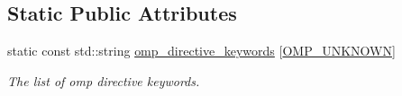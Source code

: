 \subsection*{Static Public Attributes}
\begin{DoxyCompactItemize}
\item 
static const std\+::string \hyperlink{classpragma__manager_ae98fee9f9beb214e7945b0b4eeb69522}{omp\+\_\+directive\+\_\+keywords} \mbox{[}\hyperlink{classpragma__manager_a181a86a91d4331ed5c884f9cec850238a0e29e86dce86c612ba2667d0af467027}{O\+M\+P\+\_\+\+U\+N\+K\+N\+O\+WN}\mbox{]}
\begin{DoxyCompactList}\small\item\em The list of omp directive keywords. \end{DoxyCompactList}\end{DoxyCompactItemize}
